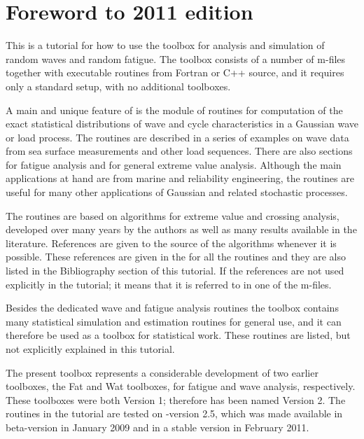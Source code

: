 \section*{Foreword to 2011 edition}
\vspace{-0mm}
This is a tutorial for how to use the \ML{} toolbox
\wf{} for analysis and simulation of random waves and random fatigue.
The toolbox
consists of a number of \ML{} m-files together with executable
routines from {\sc Fortran} or C++ source, and it requires only a
standard \ML{} setup, with no additional toolboxes.

A main and unique feature of \wf{} is the module of routines
for computation of the exact statistical distributions of
wave and cycle characteristics in a Gaussian
wave or load process. The routines are described in a series
of examples on wave data from sea surface measurements
and other load sequences. There are also sections for
fatigue analysis and for general extreme value analysis.
Although the main applications at hand are from marine and
reliability engineering, the routines are useful
for many other applications of Gaussian and related
stochastic processes.

The routines are based on algorithms for
extreme value and crossing analysis, developed over many years by the
authors as well as many results available in the literature. References are
given to the source of the algorithms whenever it is possible.
These references are given in the  for all the routines and they
are also listed in the Bibliography section of this tutorial.
If the references are not used explicitly in the tutorial;
it means that it is referred to in one of the \ML{} m-files.

Besides the dedicated wave and fatigue analysis routines the toolbox
contains many statistical simulation and estimation
routines for general use, and it can therefore be used as a
toolbox for statistical work.
These routines are listed, but not explicitly explained
in this tutorial.

The present toolbox
represents a considerable development of two earlier toolboxes,
the {\sc Fat} and {\sc Wat} toolboxes, for fatigue and wave analysis, respectively.
These toolboxes were both Version 1; therefore  \wf{} has been
named Version 2. The routines in the tutorial are tested
on \wf-{version} 2.5, which was made available in
beta-version in January 2009 and in a stable version
in February 2011.

